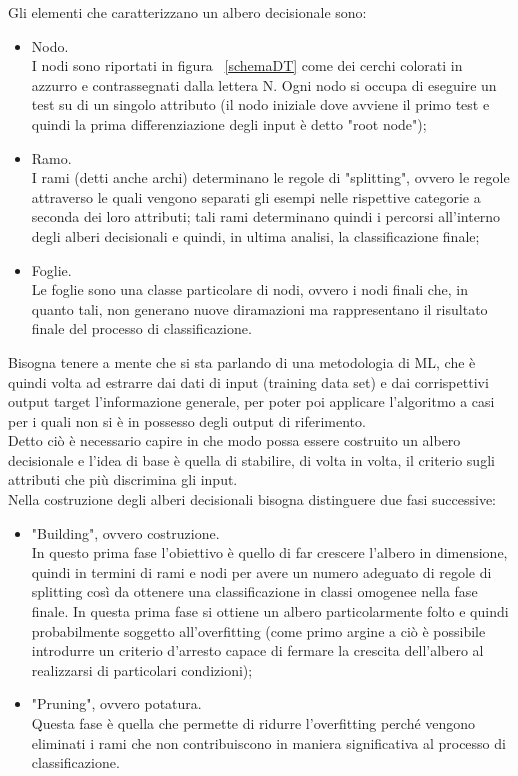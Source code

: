 Gli elementi che caratterizzano un albero decisionale sono:
\begin{itemize}
	\item Nodo. \\
	I nodi sono riportati in figura ~\ref{schemaDT} come dei cerchi colorati in azzurro e contrassegnati dalla lettera N. Ogni nodo si occupa di eseguire un test su di un singolo attributo (il nodo iniziale dove avviene il primo test e quindi la prima differenziazione degli input è detto "root node");
	\item Ramo. \\
	I rami (detti anche archi) determinano le regole di "splitting", ovvero le regole attraverso le quali vengono separati gli esempi nelle rispettive categorie a seconda dei loro attributi; tali rami determinano quindi i percorsi all'interno degli alberi decisionali e quindi, in ultima analisi, la classificazione finale;
	\item Foglie. \\
	Le foglie sono una classe particolare di nodi, ovvero i nodi finali che, in quanto tali, non generano nuove diramazioni ma rappresentano il risultato finale del processo di classificazione.
\end{itemize}

Bisogna tenere a mente che si sta parlando di una metodologia di ML, che è quindi volta ad estrarre dai dati di input (training data set) e dai corrispettivi output target l'informazione generale, per poter poi applicare l'algoritmo a casi per i quali non si è in possesso degli output di riferimento.\\
Detto ciò è necessario capire in che modo possa essere costruito un albero decisionale e l'idea di base è quella di stabilire, di volta in volta, il criterio sugli attributi che più discrimina gli input. \\
Nella costruzione degli alberi decisionali bisogna distinguere due fasi successive:
\begin{itemize}
	\item "Building", ovvero costruzione.\\
	In questo prima fase l'obiettivo è quello di far crescere l'albero in dimensione, quindi in termini di rami e nodi per avere un numero adeguato di regole di splitting così da ottenere una classificazione in classi omogenee nella fase finale. In questa prima fase si ottiene un albero particolarmente folto e quindi probabilmente soggetto all'overfitting (come primo argine a ciò è possibile introdurre un criterio d'arresto capace di fermare la crescita dell'albero al realizzarsi di particolari condizioni);
	\item "Pruning", ovvero potatura.\\
	Questa fase è quella che permette di ridurre l'overfitting perché vengono eliminati i rami che non contribuiscono in maniera significativa al processo di classificazione.
	
\end{itemize} 

